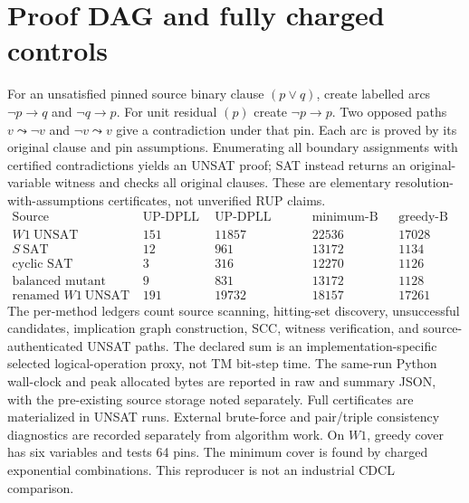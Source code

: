 \documentclass[10pt]{article}
\begin{document}
\section{Proof DAG and fully charged controls}
For an unsatisfied pinned source binary clause $(p\vee q)$, create labelled arcs $\neg p\to q$ and $\neg q\to p$. For unit residual $(p)$ create $\neg p\to p$. Two opposed paths $v\leadsto\neg v$ and $\neg v\leadsto v$ give a contradiction under that pin. Each arc is proved by its original clause and pin assumptions. Enumerating all boundary assignments with certified contradictions yields an UNSAT proof; SAT instead returns an original-variable witness and checks all original clauses. These are elementary resolution-with-assumptions certificates, not unverified RUP claims.
\[
\begin{array}{l|r|r|r|r}
\text{Source}&\text{UP-DPLL nodes}&\text{UP-DPLL selected work}&
\text{minimum-B work}&\text{greedy-B work}\\ \hline
W1\ \mathrm{UNSAT}&151&11857&22536&17028\\
S\ \mathrm{SAT}&12&961&13172&1134\\
\text{cyclic SAT}&3&316&12270&1126\\
\text{balanced mutant SAT}&9&831&13172&1128\\
\text{renamed }W1\ \mathrm{UNSAT}&191&19732&18157&17261
\end{array}
\]
The per-method ledgers count source scanning, hitting-set discovery, unsuccessful candidates, implication graph construction, SCC, witness verification, and source-authenticated UNSAT paths. The declared sum is an implementation-specific selected logical-operation proxy, not TM bit-step time. The same-run Python wall-clock and peak allocated bytes are reported in raw and summary JSON, with the pre-existing source storage noted separately. Full certificates are materialized in UNSAT runs. External brute-force and pair/triple consistency diagnostics are recorded separately from algorithm work. On $W1$, greedy cover has six variables and tests 64 pins. The minimum cover is found by charged exponential combinations. This reproducer is not an industrial CDCL comparison.
\end{document}
